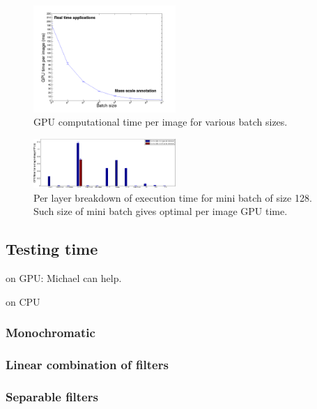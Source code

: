 \documentclass{article}
\begin{document}
\begin{figure}[ht]
  \includegraphics[width=0.48\textwidth]{img/eval_per_batch_GPU.png}
  \caption{GPU computational time per image for various batch sizes.}
\end{figure}
\begin{figure}[ht]
  \includegraphics[width=0.48\textwidth]{img/eval_per_layer_per_batch_GPU_128_batch_size.png}
  \caption{Per layer breakdown of execution time for mini batch of size 128. Such size of mini batch gives optimal per image GPU time.}
\end{figure}

\subsection{Testing time}

on GPU: Michael can help.

on CPU

\subsubsection{Monochromatic}

\subsubsection{Linear combination of filters}

\subsubsection{Separable filters}
\end{document}
